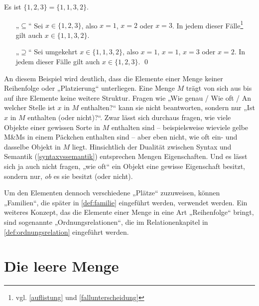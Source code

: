 \begin{bsp}[*] \label{bsp:mengengleichbeweis}
    Es ist $\{1,2,3\}=\{1,1,3,2\}$.
\end{bsp}


\begin{bew}
    \begin{itemize}
        \item[„$\subseteq$“] Sei $x\in\{1,2,3\}$, also $x=1$, $x=2$ oder $x=3$. In jedem dieser Fälle\footnote{vgl. \cref{auflistung} und \cref{fallunterscheidung}} gilt auch $x\in\{1,1,3,2\}$.
        \item[„$\supseteq$“] Sei umgekehrt $x\in\{1,1,3,2\}$,  also $x=1$, $x=1$, $x=3$ oder $x=2$. In jedem dieser Fälle gilt auch $x\in\{1,2,3\}$. \qed
    \end{itemize}
\end{bew}


\begin{bem} \label{mengenstrukturlos}
    An diesem Beispiel wird deutlich, dass die Elemente einer Menge keiner Reihenfolge oder „Platzierung“ unterliegen. Eine Menge $M$ trägt von sich aus bis auf ihre Elemente keine weitere Struktur. Fragen wie „Wie genau / Wie oft / An welcher Stelle ist $x$ in $M$ enthalten?“ kann sie nicht beantworten, sondern nur „Ist $x$ in $M$ enthalten (oder nicht)?“. Zwar lässt sich durchaus fragen, wie viele Objekte einer gewissen Sorte in $M$ enthalten sind -- beispielsweise wieviele gelbe M\&Ms in einem Päckchen enthalten sind -- aber eben nicht, wie oft ein- und dasselbe Objekt in $M$ liegt. Hinsichtlich der Dualität zwischen Syntax und Semantik (\cref{syntaxvssemantik}) entsprechen Mengen Eigenschaften. Und es lässt sich ja auch nicht fragen, „wie oft“ ein Objekt eine gewisse Eigenschaft besitzt, sondern nur, \emph{ob} es sie besitzt (oder nicht).
    
    Um den Elementen dennoch verschiedene „Plätze“ zuzuweisen, können „Familien“, die später in \cref{def:familie} eingeführt werden, verwendet werden. Ein weiteres Konzept, das die Elemente einer Menge in eine Art „Reihenfolge“ bringt, sind sogenannte „Ordnungsrelationen“, die im Relationenkapitel in \cref{def:ordnungsrelation} eingeführt werden.
\end{bem}





\section{Die leere Menge}


